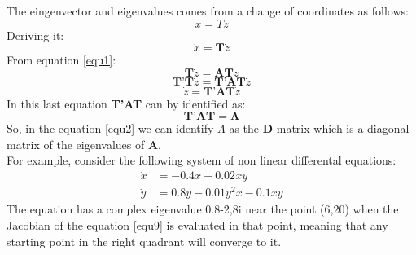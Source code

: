 \documentclass[journal]{IEEEtai}
\begin{document}
The eingenvector and eigenvalues comes from a change of coordinates as follows:
\begin{equation}\label{equ3}
x=Tz
\end{equation}
Deriving it:
\begin{equation}\label{equ4}
\dot{x}=\textbf{T}\dot{z}
\end{equation}
From equation \ref{equ1}:
\begin{equation}\label{equ5}
\textbf{T}\dot{z}=\textbf{A}\textbf{T}\dot{z}
\end{equation}
\begin{equation}\label{equ6}
\textbf{T'}\textbf{T}\dot{z}=\textbf{T'}\textbf{A}\textbf{T}\dot{z}
\end{equation}
\begin{equation}\label{equ7}
\dot{z}=\textbf{T'}\textbf{A}\textbf{T}\dot{z}
\end{equation}
In this last equation \textbf{T'}\textbf{A}\textbf{T} can by identified as:
\begin{equation}\label{equ8}
\textbf{T'}\textbf{A}\textbf{T}=\mathbf{\Lambda}
\end{equation}
So, in the equation \ref{equ2} we can identify $\Lambda$ as the \textbf{D} matrix which is a diagonal matrix of the eigenvalues of \textbf{A}.\\
For example, consider the following system of non linear differental equations:
\begin{equation}\label{equ9}
\begin{array} {rcr}
\dot{x}& =-0.4x + 0.02xy\\
\dot{y}&= 0.8y - 0.01y^2x - 0.1xy 
\end{array}
\end{equation}
The equation has a complex eigenvalue 0.8-2,8i near the point (6,20) when the Jacobian of the equation \ref{equ9} is evaluated in that point,  meaning that any starting point in the right quadrant will converge to it. 
\end{document}

